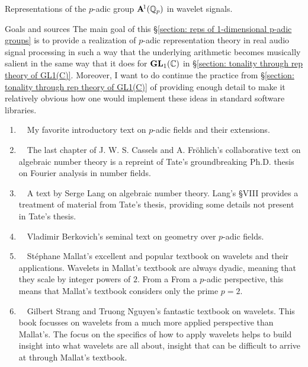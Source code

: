 \documentclass[letterpaper,11pt, reqno]{amsart}
\newtheorem{monodromy theorem}{Monodromy Theorem}[subsection]
\newtheorem{wild conjecture}[theorem]{Wild Conjecture}
\newtheorem{research objectives}{Research objectives}[subsection]
\newtheorem{research question}[theorem]{Research questions}
\newtheorem{aside question}[theorem]{Aside question}
\newtheorem{audio example}[theorem]{\loudspeaker[3] Example}
\newtheorem{blank remark}[theorem]{}
\newtheorem{terminology and comment}[theorem]{Terminology and comment}
\newtheorem{purity hypothesis}[theorem]{Purity hypothesis}
\newtheorem{corollary of the purity hypothesis}[theorem]{Corollary of the purity hypothesis}
\newcommand{\CC} {{\mathbb C}}
\numberwithin{equation}{theorem}
\begin{document}
\begin{section}{Representations of the $p$-adic group $\bold{A}^{\!1}(\mathbb{Q}_{p})$ in wavelet signals.}\label{section: reps of 1-dimensional p-adic groups}

\begin{subsection}{Goals and sources}
	The main goal of this \S\ref{section: reps of 1-dimensional p-adic groups} is to provide a realization of $p$-adic representation theory in real audio signal processing in such a way that the underlying arithmetic becomes musically salient in the same way that it does for $\bold{GL}_{1}(\CC)$ in \S\ref{section: tonality through rep theory of GL1(C)}. Moreover, I want to do continue the practice from \S\ref{section: tonality through rep theory of GL1(C)} of providing enough detail to make it relatively obvious how one would implement these ideas in standard software libraries.
	\begin{enumerate}[{\bf\ \ \ \ \ \ 1.}]
	\item
	\cite[Chp. 4]{Guillot}\ \textemdash\ My favorite introductory text on $p$-adic fields and their extensions.
	\item
	\cite[Chp. XV: {\em J. T. Tate's thesis}, 1950]{CF}\ \textemdash\ The last chapter of J. W. S. Cassels and A. Fr\"ohlich's collaborative text on algebraic number theory is a repreint of Tate's  groundbreaking Ph.D. thesis on  Fourier analysis in number fields.
	\item
	\cite[\S VII]{Lang}\ \textemdash\ A text by Serge Lang on algebraic number theory. Lang's \S VIII provides a treatment of material from Tate's thesis, providing some details not present in Tate's thesis.
	\item
	\cite{Berkovich}\ \textemdash\ Vladimir Berkovich's seminal text on geometry over $p$-adic fields.
	\item
	\cite[\S 7.2.3]{Mallat}\ \textemdash\ St\'ephane Mallat's excellent and popular textbook on wavelets and their applications. Wavelets in Mallat's textbook are always dyadic, meaning that they scale by integer powers of $2$. From a From a $p$-adic perspective, this means that Mallat's textbook considers only the prime $p=2$.
	\item
	\cite[\S5.5]{SN}\ \textemdash\ Gilbert Strang and Truong Nguyen's fantastic textbook on wavelets. This book focusses on wavelets from a much more applied perspective than Mallat's. The focus on  the specifics of how to apply wavelets helps to build insight into what wavelets are all about, insight that can be difficult to arrive at through Mallat's textbook. 

\end{enumerate}
\end{subsection}
\end{section}
\end{document}
